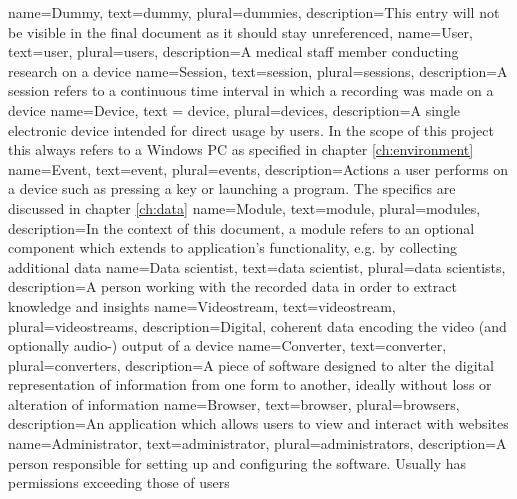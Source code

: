 \label{ch:glossary}

{
	name=Dummy, %
	text=dummy, %
	plural=dummies, %
	description={This entry will not be visible in the final document as it should stay unreferenced}, %
}
{
	name=User,
	text=user,
	plural=users,
	description={A medical staff member conducting research on a \gls{device}}
}
{
	name=Session,
	text=session,
	plural=sessions,
	description={A session refers to a continuous time interval in which a recording was made on a \gls{device}}
}
{
	name=Device,
	text = device,
	plural=devices,
	description={A single electronic device intended for direct usage by \glspl{user}. In the scope of this project this always refers to a Windows PC as specified in chapter \ref{ch:environment}}
}
{
	name=Event,
	text=event,
	plural=events,
	description={Actions a user performs on a \gls{device} such as pressing a key or launching a program. The specifics are discussed in chapter \ref{ch:data}}
}
{
	name=Module,
	text=module,
	plural=modules,
	description={In the context of this document, a module refers to an optional component which extends to application's functionality, e.g. by collecting additional data}
}
{
	name=Data scientist,
	text=data scientist,
	plural=data scientists,
	description={A person working with the recorded data in order to extract knowledge and insights}
}
{
	name=Videostream,
	text=videostream,
	plural=videostreams,
	description={Digital, coherent data encoding the video (and optionally audio-) output of a \gls{device}}
}
{
	name=Converter,
	text=converter,
	plural=converters,
	description={A piece of software designed to alter the digital representation of information from one form to another, ideally without loss or alteration of information}
}
{
	name=Browser,
	text=browser,
	plural=browsers,
	description={An application which allows \glspl{user} to view and interact with websites}
}
{
	name=Administrator,
	text=administrator,
	plural=administrators,
	description={A person responsible for setting up and configuring the software. Usually has permissions exceeding those of \glspl{user}}
}